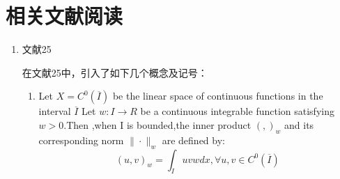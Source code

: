 \part{相关文献阅读}
\begin{enumerate}
\item 文献25

在文献25中，引入了如下几个概念及记号：
\begin{enumerate}
\item Let $X=C^0(\overline{I})$ be the linear space of
continuous functions in the interval $\overline{I}$
Let $w:I\rightarrow R$ be a continuous integrable function
satisfying $w>0$.Then ,when I is bounded,the inner product
$( , )_w$ and its corresponding norm $\|\cdot\|_w$ are defined by:
\[ (u,v)_w=\int_Iuvwdx ,\forall u,v\in C^0(\overline{I})\]

\end{enumerate}

\end{enumerate}